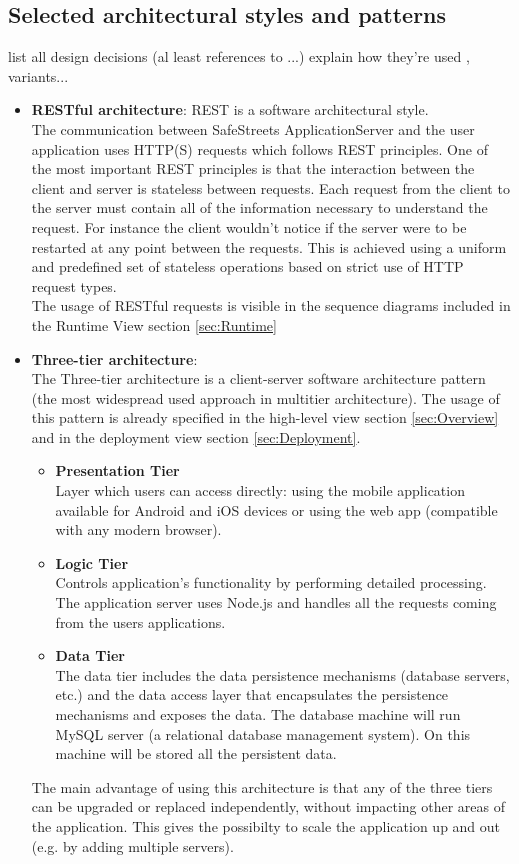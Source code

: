 \documentclass{article}
\begin{document}
\subsection{Selected architectural styles and patterns}
list all design decisions (al least references to ...) explain how they're used , variants...
\begin{itemize}
\item \textbf{RESTful architecture}: REST is a software architectural style. \\
The communication between SafeStreets ApplicationServer and the user application uses HTTP(S) requests which follows REST principles.
One of the most important REST principles is that the interaction between the client and server is stateless between requests. Each request from the client to the server must contain all of the information necessary to understand the request. For instance the client wouldn’t notice if the server were to be restarted at any point between the requests.
This is achieved using a uniform and predefined set of stateless operations based on strict use of HTTP request types.\\
The usage of RESTful requests is visible in the sequence diagrams included in the Runtime View section \ref{sec:Runtime} \\

\item \textbf{Three-tier architecture}: \\
The Three-tier architecture is a client-server software architecture pattern (the most widespread used approach in multitier architecture).
The usage of this pattern is already specified in the high-level view section \ref{sec:Overview} and in the deployment view section \ref{sec:Deployment}.
\begin{itemize}
	\item \textbf{Presentation Tier} \\
	Layer which users can access directly: using the mobile application available for Android and iOS devices or using the web app (compatible with any modern browser).
	\item \textbf{Logic Tier} \\ 
	Controls application’s functionality by performing detailed processing. The application server uses Node.js and handles all the requests coming from the users applications.
	\item \textbf{Data Tier} \\
	The data tier includes the data persistence mechanisms (database servers, etc.) and the data access layer that encapsulates the persistence mechanisms and exposes the data. The database machine will run MySQL server (a relational database management system). On this machine will be stored all the persistent data.
\end{itemize}
The main advantage of using this architecture is that any of the three tiers can be upgraded or replaced independently, without impacting other areas of the application. This gives the possibilty to scale the application up and out (e.g. by adding multiple servers).
\end{itemize}
\end{document}
